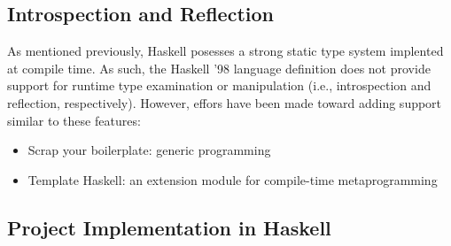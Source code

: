 \documentclass[titlepage,12pt]{article}
\newcommand{\bi}{\begin{itemize}}
\newcommand{\ei}{\end{itemize}}
\begin{document}
\subsection{Introspection and Reflection}
As mentioned previously, Haskell posesses a strong static type system
implented at compile time. As such, the Haskell '98 language definition
does not provide support for runtime type examination or manipulation
(i.e., introspection and reflection, respectively).  However, effors have been
made toward adding support similar to these features:
\bi
    \item Scrap your boilerplate: generic programming~\cite{haskell-syb}
    \item Template Haskell: an extension module for compile-time metaprogramming~\cite{haskell-th}
\ei


\newpage
\begin{appendices}
\section{Project Implementation in Haskell}
\inputminted{haskell}{src/InfixPostfix.hs}
\newpage
\inputminted{haskell}{src/InfixPostfixTest.hs}
\end{appendices}


\newpage


\end{document}
